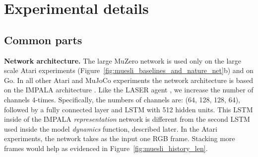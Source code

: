 \documentclass{article}
\begin{document}
\begin{table*}[htb]
\vskip -0.1in
\caption{The mean score from the last 100 episodes at 40M frames on games used by TreeQN and ATreeC. The agents differ along multiple dimensions.
}
\label{tab:atari_treeqn}
\vskip -0.0in
\begin{center}
\end{center}
\vskip -0.1in
\end{table*}



\section{Experimental details}
\label{sec:appendix_experiment_details}
  
\subsection{Common parts}
\textbf{Network architecture.} The large MuZero network is used only on the large scale Atari experiments (Figure~\ref{fig:muesli_baselines_and_nature_net}b) and on Go. In all other Atari and MuJoCo experiments the network architecture is based on the IMPALA architecture \citep{espeholt2018impala}. Like the LASER agent \citep{schmitt2020}, we increase the number of channels 4-times. Specifically, the numbers of channels are: (64, 128, 128, 64), followed by a fully connected layer and LSTM \citep{hochreiter1997long} with 512 hidden units. This LSTM inside of the IMPALA \emph{representation} network is different from the second LSTM used inside the model \emph{dynamics} function, described later.
In the Atari experiments, the network takes as the input one RGB frame. Stacking more frames would help as evidenced in Figure~\ref{fig:muesli_history_len}. 
\end{document}

